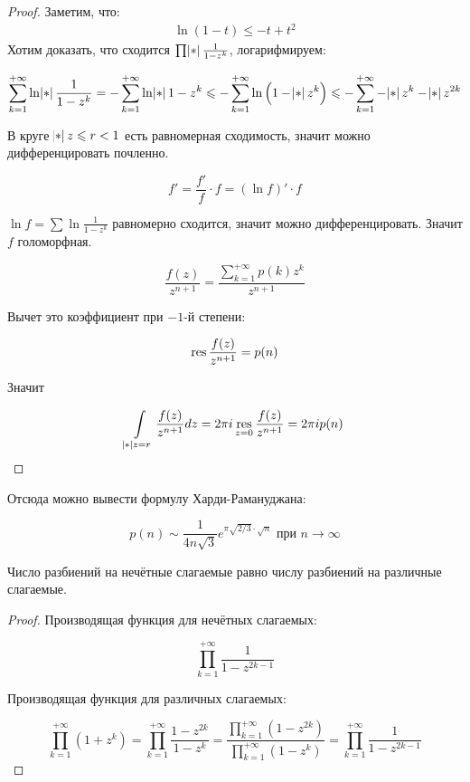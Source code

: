 \begin{proof}
    Заметим, что: 
    \begin{gather*}
        \ln(1 - t) \leqslant -t + t^2
    \end{gather*}
    Хотим доказать, что сходится $\prod \abs{\frac{1}{1-z^k}}$,
    логарифмируем:

    \[
        \sum\limits_{k=1}^{+\infty} \ln \abs{\frac{1}{1-z^k}}
        = -\sum\limits_{k=1}^{+\infty} \ln \abs{1-z^k}
        \le -\sum\limits_{k=1}^{+\infty} \ln \left(1-\abs{z}^k\right)
        \le -\sum\limits_{k=1}^{+\infty} -\abs{z}^k - \abs{z}^{2k}
    \]

    В круге $\abs z \le r < 1$ есть равномерная сходимость,
    значит можно дифференцировать почленно.

    \[
        f' = \frac{f'}{f} \cdot f
        = (\ln f)' \cdot f
    \]

    $\ln f = \sum \ln \frac{1}{1-z^k}$ равномерно сходится,
    значит можно дифференцировать. Значит $f$ голоморфная.

    \[
        \frac{f(z)}{z^{n+1}}
        = \frac{\sum\limits_{k=1}^{+\infty} p(k)z^k}{z^{n+1}}
    \]

    Вычет это коэффициент при $-1$-й степени:

    \[
        \operatorname*{res} \frac{f(z)}{z^{n+1}} = p(n)
    \]

    Значит

    \[
        \int\limits_{\abs z = r} \frac{f(z)}{z^{n+1}}dz
        = 2\pi i \res\limits_{z= 0} \frac{f(z)}{z^{n+1}} = 2\pi i p(n)
    \]
\end{proof}

\begin{observation}
    Отсюда можно вывести формулу Харди-Рамануджана:

    \[
        p(n) \sim \frac{1}{4n\sqrt 3} e^{\pi \sqrt{2/3} \cdot \sqrt{n}}
        \text{ при } n \to \infty
    \]
\end{observation}

\begin{theorem}[Эйлер]
    Число разбиений на нечётные слагаемые равно числу разбиений на различные слагаемые.
\end{theorem}

\begin{proof}
    Производящая функция для нечётных слагаемых:

    \[
        \prod_{k=1}^{+\infty} \frac{1}{1-z^{2k-1}}
    \]

    Производящая функция для различных слагаемых:

    \[
        \prod_{k=1}^{+\infty} (1+z^k)
        = \prod_{k=1}^{+\infty} \frac{1-z^{2k}}{1-z^k}
        =
        \frac{\prod_{k=1}^{+\infty} (1-z^{2k})}
        {\prod_{k=1}^{+\infty} (1-z^{k})}
        =\prod_{k=1}^{+\infty} \frac{1}{1-z^{2k-1}}
    \]
\end{proof}

\newpage

